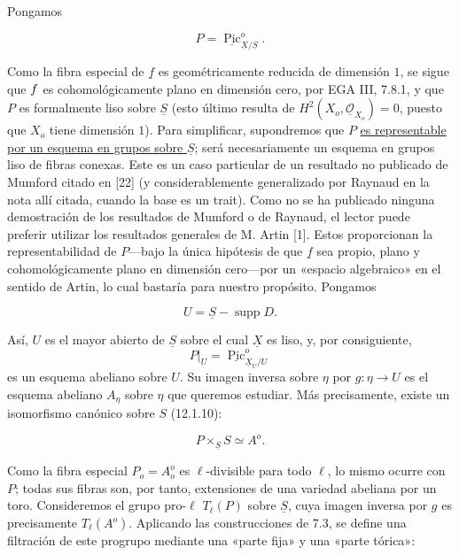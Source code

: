 \noindent
Pongamos

\begin{equation}\tag{12.8.3}
 P=\underline{\operatorname{Pic}}^{o}_{\underline X/\underline S}.
\end{equation}

\noindent
Como la fibra especial de $\underline f$ es geométricamente reducida de
dimensión $1$, se sigue que $\sisi{\underline F}{\underline f}$ es cohomológicamente plano en
dimensión cero, por EGA III, 7.8.1, y que $P$ es formalmente liso sobre
$\underline S$ (esto último resulta de
$H^2(X_o,\underline{\mathcal O}_{X_o})=0$, puesto que $X_o$ tiene
dimensión $1$). Para simplificar, supondremos que $P$
\underline{es representable por un esquema en grupos sobre
$\underline S$}; será necesariamente un esquema en grupos liso de
fibras conexas. Este es un caso particular de un resultado no publicado
de Mumford citado en [22] (y considerablemente generalizado por Raynaud
en la nota allí citada, cuando la base es un trait). Como no se ha
publicado ninguna demostración de los resultados de Mumford o de Raynaud,
el lector puede preferir utilizar los resultados generales de M. Artin
[1]. Estos proporcionan la representabilidad de $P$---bajo la única
hipótesis de que $\underline f$ sea propio, plano y cohomológicamente
plano en dimensión cero---por un «espacio algebraico» en el sentido de
Artin, lo cual bastaría para nuestro propósito. Pongamos


\begin{equation}\tag{12.8.4}
 U=\underline S-\operatorname{supp}D.
\end{equation}

\noindent
Así, $U$ es el mayor abierto de $\underline S$ sobre el cual
$\underline X$ es liso, y, por consiguiente,
\[
 P|_U=\underline{\operatorname{Pic}}^{o}_{\underline X_U/U}
\]
es un esquema abeliano sobre $U$. Su imagen inversa sobre $\eta$ por
$g:\eta\longrightarrow U$ es el esquema abeliano $A_\eta$ sobre $\eta$
que queremos estudiar. Más precisamente, existe un isomorfismo canónico
sobre $S$ (12.1.10):

\begin{equation}\tag{12.8.5}
 P\times_{\underline S}S\simeq A^{o}.
\end{equation}

\noindent
Como la fibra especial $P_o=A_o^{o}$ es $\ell$-divisible para todo
$\ell$, lo mismo ocurre con $P$; todas sus fibras son, por tanto,
extensiones de una variedad abeliana por un toro. Consideremos el grupo
pro-$\ell$ $T_\ell(P)$ sobre $\underline S$, cuya imagen inversa por $g$
es precisamente $T_\ell(A^{o})$. Aplicando las construcciones de 7.3, se
define una filtración de este progrupo mediante una «parte fija» y una
«parte tórica»:

